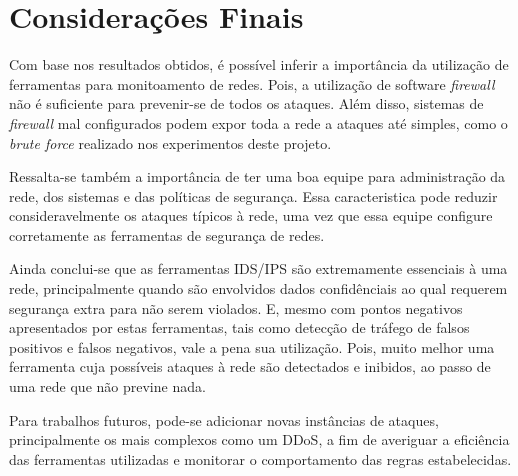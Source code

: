 \chapter[Considerações Finais]{Considerações Finais}
\label{chap:consideracoes}

	Com base nos resultados obtidos, é possível inferir a importância da utilização de ferramentas para monitoamento de redes. Pois, a utilização de software \emph{firewall} não é suficiente para prevenir-se de todos os ataques. Além disso, sistemas de \emph{firewall} mal configurados podem expor toda a rede a ataques até simples, como o \emph{brute force} realizado nos experimentos deste projeto.
 
	Ressalta-se também a importância de ter uma boa equipe para administração da rede, dos sistemas e das políticas de segurança. Essa caracteristica pode reduzir consideravelmente os ataques típicos à rede, uma vez que essa equipe configure corretamente as ferramentas de segurança de redes.

	Ainda conclui-se que as ferramentas IDS/IPS são extremamente essenciais à uma rede, principalmente quando são envolvidos dados confidênciais ao qual requerem segurança extra para não serem violados. E, mesmo com pontos negativos apresentados por estas ferramentas, tais como detecção de tráfego de falsos positivos e falsos negativos, vale a pena sua utilização. Pois, muito melhor uma ferramenta cuja possíveis ataques à rede são detectados e inibidos, ao passo de uma rede que não previne nada.
	
	Para trabalhos futuros, pode-se adicionar novas instâncias de ataques, principalmente os mais complexos como um DDoS, a fim de averiguar a eficiência das ferramentas utilizadas e monitorar o comportamento das regras estabelecidas.